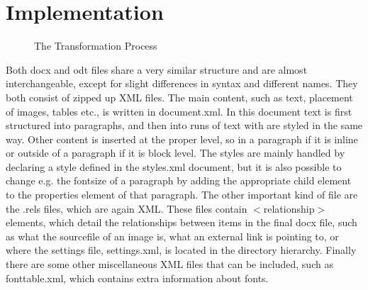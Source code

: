 \documentclass{llncs}
\def\latexml{{\LaTeX}ML\xspace}
\begin{document}
\section{Implementation}\label{sec:impl}

\begin{figure}[ht]\centering
{}
\caption{The Transformation Process}\label{fig:arch}
\end{figure}

Both docx and odt files share a very similar structure and are almost interchangeable,
except for slight differences in syntax and different names. They both consist of zipped up XML files. The main content, such as text, placement of images, tables etc., is written in document.xml. In this document text is first structured into paragraphs, and then into runs of text with are styled in the same way. Other content is inserted at the proper level, so in a paragraph if it is inline or outside of a paragraph if it is block level. The styles are mainly handled by declaring a style defined in the styles.xml document, but it is also possible to change e.g. the fontsize of a paragraph by adding the appropriate child element to the properties element of that paragraph. The other important kind of file are the .rels files, which are again XML. These files contain $<$relationship$>$ elements, which detail the relationships between items in the final docx file, such as what the sourcefile of an image is, what an external link is pointing to, or where the settings file, settings.xml, is located in the directory hierarchy. Finally there are some other miscellaneous XML files that can be included, such as fonttable.xml, which contains extra information about fonts.  \\
\end{document}

